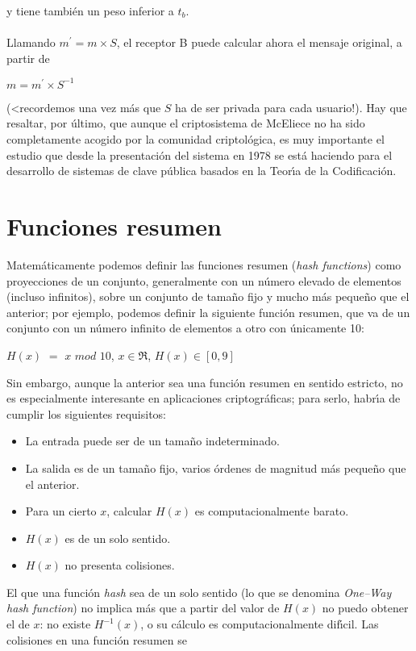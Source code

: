 y tiene tambi\'en un peso inferior a $t_{b}$.\\
\\Llamando $m^{\prime} = m\times S$, el receptor B puede calcular ahora el 
mensaje original, a partir de
\begin{center}
$m=m^{\prime} \times S^{-1}$
\end{center}
(<recordemos una vez m\'as que $S$ ha de ser privada para cada usuario!).
Hay que resaltar, por \'ultimo, que aunque el criptosistema de
McEliece no ha sido completamente acogido por la comunidad criptol\'ogica,
es muy importante el estudio que desde la presentaci\'on del sistema
en 1978 se est\'a haciendo para el desarrollo de sistemas de clave
p\'ublica basados en la Teor\'{\i}a de la Codificaci\'on.
\section{Funciones resumen}
Matem\'aticamente podemos definir las funciones resumen ({\it hash functions}) 
como proyecciones de un conjunto, generalmente con un n\'umero elevado de 
elementos (incluso infinitos), sobre un conjunto de tama\~no fijo y mucho m\'as 
peque\~no que el anterior; por ejemplo, podemos definir la siguiente funci\'on 
resumen, que va de un conjunto con un n\'umero infinito de elementos a otro
con \'unicamente 10:
\begin{center}
$H(x)$ $=$ $x$ $mod$ $10$, $x \in \Re$, $H(x) \in [0,9]$
\end{center}
Sin embargo, aunque la anterior sea una funci\'on resumen en sentido estricto, 
no es especialmente interesante en aplicaciones criptogr\'aficas; para serlo, 
habr\'{\i}a de cumplir los siguientes requisitos:
\begin{itemize}
\item La entrada puede ser de un tama\~no indeterminado.
\item La salida es de un tama\~no fijo, varios \'ordenes de magnitud m\'as
peque\~no que el anterior.
\item Para un cierto $x$, calcular $H(x)$ es computacionalmente barato.
\item $H(x)$ es de un solo sentido.
\item $H(x)$ no presenta colisiones.
\end{itemize}
El que una funci\'on {\it hash} sea de un solo sentido (lo que se denomina {\it
One--Way hash function}) no implica m\'as que a partir del valor de $H(x)$
no puedo obtener el de $x$: no existe $H^{-1}(x)$, o su c\'alculo es 
computacionalmente dif\'{\i}cil. Las colisiones en una funci\'on resumen se
